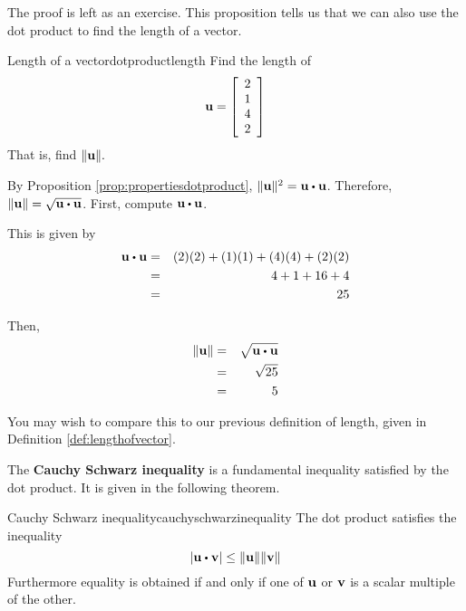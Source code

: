 The proof is left as an exercise. This proposition tells us that we can also use the dot product to find the length of a vector.

\begin{example}{Length of a vector}{dotproductlength}
Find the length of
\begin{equation*}
{\bf u}
=
\left[ 
\begin{array}{r}
2 \\
1 \\
4 \\
2
\end{array}
\right] 
\end{equation*}
 That is, find $\| {\bf u} \| .$
\end{example}

\begin{solution}
By Proposition \ref{prop:propertiesdotproduct},  $\vectlength \vect{u} \vectlength ^{2} = \vect{u} \dotprod \vect{u}$. 
Therefore, $\vectlength \vect{u} \vectlength = \sqrt {\vect{u} \dotprod \vect{u}}$.
First, compute $\vect{u} \dotprod \vect{u}$. 

This is given by 
\begin{eqnarray*}
\vect{u} \dotprod \vect{u}
&=&
(2)(2) + (1)(1) + (4)(4) + (2)(2) \\
&=&
4 + 1 + 16 + 4 \\
&=&
25
\end{eqnarray*}

Then, 
\begin{eqnarray*}
\vectlength \vect{u} \vectlength 
&=& \sqrt {\vect{u} \dotprod \vect{u}} \\
&=& \sqrt{25} \\
&=& 5
\end{eqnarray*}
\end{solution}

You may wish to compare this to our previous definition of length, 
given in Definition \ref{def:lengthofvector}. 

The \textbf{Cauchy Schwarz inequality} is a fundamental inequality satisfied by the dot product. 
 It is given in the following theorem.

\begin{theorem}{Cauchy Schwarz inequality}{cauchyschwarzinequality}
The dot product satisfies the inequality
\begin{equation}
\left\vert \vect{u}\dotprod \vect{v}\right\vert \leq \vectlength \vect{u}\vectlength \vectlength \vect{v}\vectlength   \label{cauchy}
\end{equation}
Furthermore equality is obtained if and only if one of ${\bf u}$ or ${\bf v}$ is a scalar multiple of the other.
\end{theorem}

